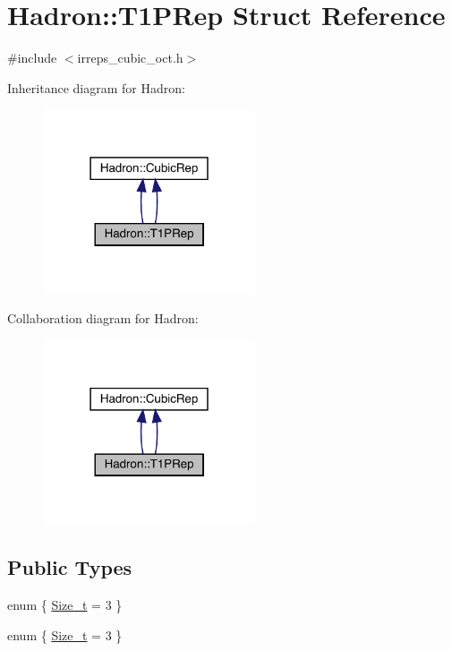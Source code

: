 \hypertarget{structHadron_1_1T1PRep}{}\section{Hadron\+:\+:T1\+P\+Rep Struct Reference}
\label{structHadron_1_1T1PRep}


{\ttfamily \#include $<$irreps\+\_\+cubic\+\_\+oct.\+h$>$}



Inheritance diagram for Hadron\+:\nopagebreak
\begin{figure}[H]
\begin{center}
\leavevmode
\includegraphics[width=178pt]{db/daf/structHadron_1_1T1PRep__inherit__graph}
\end{center}
\end{figure}


Collaboration diagram for Hadron\+:\nopagebreak
\begin{figure}[H]
\begin{center}
\leavevmode
\includegraphics[width=178pt]{dc/d2c/structHadron_1_1T1PRep__coll__graph}
\end{center}
\end{figure}
\subsection*{Public Types}
\begin{DoxyCompactItemize}
\item 
enum \{ \mbox{\hyperlink{structHadron_1_1T1PRep_a48ed3c45634568c52efa79156ec26262a6a22073dff755f03a0da1a8ad313b559}{Size\+\_\+t}} = 3
 \}
\item 
enum \{ \mbox{\hyperlink{structHadron_1_1T1PRep_a48ed3c45634568c52efa79156ec26262a6a22073dff755f03a0da1a8ad313b559}{Size\+\_\+t}} = 3
 \}
\end{DoxyCompactItemize}
